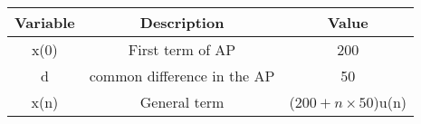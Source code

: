 \begin{tabular}{|c|c|c|}
    \hline
    \textbf{Variable} & \textbf{Description} & \textbf{Value} \\
    \hline
    x(0) & First term of AP & 200\\
    \hline
    d & common difference in the AP & 50\\
    \hline
    x(n) & General term & ($200+n\times 50$)u(n)\\
    \hline
\end{tabular}
